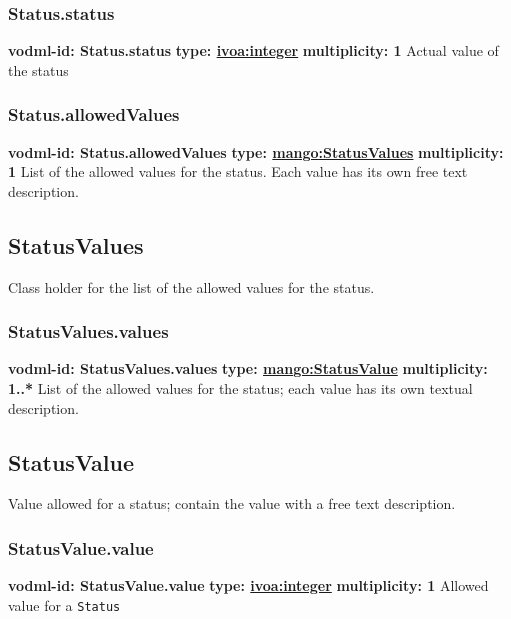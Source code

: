     \subsubsection{Status.status}
    \textbf{vodml-id: Status.status} \newline
    \textbf{type: \hyperref[sect:ivoa]{ivoa:integer}} \newline
    \textbf{multiplicity: 1} \newline
    Actual value of the status

    \subsubsection{Status.allowedValues}
    \textbf{vodml-id: Status.allowedValues} \newline
    \textbf{type: \hyperref[sect:StatusValues]{mango:StatusValues}} \newline
    \textbf{multiplicity: 1} \newline
    List of the allowed values for the status. Each value has its own free text description.

  \subsection{StatusValues}
    \label{sect:StatusValues}
    Class holder for the list of the allowed values for the status.

    \subsubsection{StatusValues.values}
    \textbf{vodml-id: StatusValues.values} \newline
    \textbf{type: \hyperref[sect:StatusValue]{mango:StatusValue}} \newline
    \textbf{multiplicity: 1..*} \newline
    List of the allowed values for the status; each value has its own textual description.

  \subsection{StatusValue}
    \label{sect:StatusValue}
    Value allowed for a status; contain the value with a free text description.

    \subsubsection{StatusValue.value}
    \textbf{vodml-id: StatusValue.value} \newline
    \textbf{type: \hyperref[sect:ivoa]{ivoa:integer}} \newline
    \textbf{multiplicity: 1} \newline
    Allowed value for a \texttt{Status}

